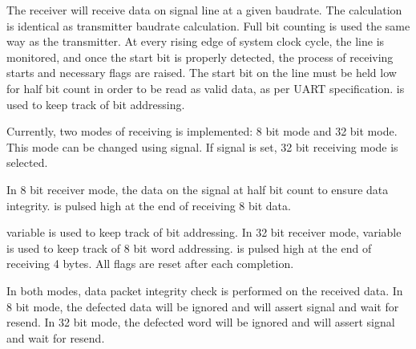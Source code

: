 The receiver will receive data on  signal line at a given baudrate. The calculation is identical as transmitter baudrate calculation. Full bit counting is used the same way as the transmitter. At every rising edge of system clock cycle, the  line is monitored, and once the start bit is properly detected, the process of receiving starts and necessary flags are raised. The start bit on the  line must be held low for half bit count in order to be read as valid data, as per UART specification.  is used to keep track of bit addressing.

Currently, two modes of receiving is implemented: 8 bit mode and 32 bit mode. This mode can be changed using  signal. If  signal is set, 32 bit receiving mode is selected.

In 8 bit receiver mode, the data on the  signal at half bit count to ensure data integrity.  is pulsed high at the end of receiving 8 bit data.

 variable is used to keep track of bit addressing. In 32 bit receiver mode,  variable is used to keep track of 8 bit word addressing.  is pulsed high at the end of receiving 4 bytes. All flags are reset after each completion.

In both modes, data packet integrity check is performed on the received data. In 8 bit mode, the defected data will be ignored and will assert  signal and wait for resend. In 32 bit mode, the defected word will be ignored and will assert  signal and wait for resend.

\newpage
